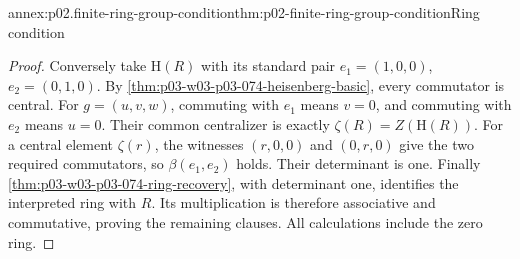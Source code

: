 \begin{annexitem}{annex:p02.finite-ring-group-condition}{thm:p02-finite-ring-group-condition}{Ring condition}
\begin{proof}
Conversely take \(\mathrm H(R)\) with its standard pair
\(e_1=(1,0,0)\), \(e_2=(0,1,0)\).
By \cref{thm:p03-w03-p03-074-heisenberg-basic}, every commutator is
central. For \(g=(u,v,w)\), commuting with \(e_1\) means \(v=0\),
and commuting with \(e_2\) means \(u=0\). Their common centralizer
is exactly \(\zeta(R)=Z(\mathrm H(R))\). For a central element
\(\zeta(r)\), the witnesses \((r,0,0)\) and \((0,r,0)\) give the
two required commutators, so \(\beta(e_1,e_2)\) holds. Their determinant is one.
Finally \cref{thm:p03-w03-p03-074-ring-recovery}, with determinant one,
identifies the interpreted ring with \(R\). Its multiplication is
therefore associative and commutative, proving the remaining clauses.
All calculations include the zero ring.
\end{proof}
\end{annexitem}

